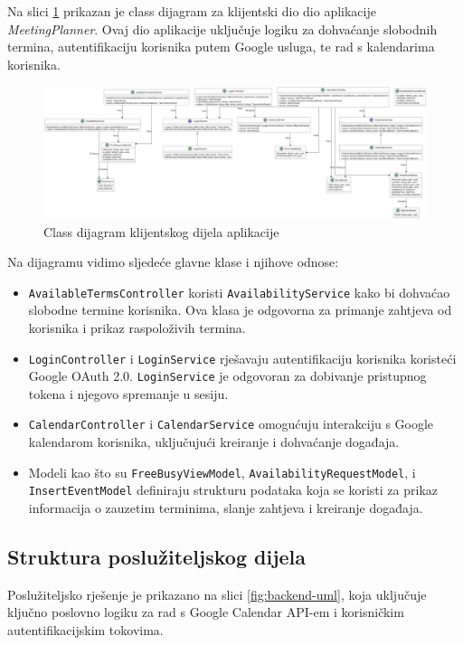 \documentclass{foi}
\begin{document}
Na slici \ref{fig:frontend-uml} prikazan je class dijagram za klijentski dio dio aplikacije \textit{MeetingPlanner}. Ovaj dio aplikacije uključuje logiku za dohvaćanje slobodnih termina, autentifikaciju korisnika putem Google usluga, te rad s kalendarima korisnika.

\begin{figure}[H]
    \centering
    \includegraphics[width=1\textwidth]{slike/MeetingPlannerFrontend_ClassUML.png}
    \caption{Class dijagram klijentskog dijela aplikacije}
    \label{fig:frontend-uml}
\end{figure}

Na dijagramu vidimo sljedeće glavne klase i njihove odnose:
\begin{itemize}
    \item \texttt{AvailableTermsController} koristi \texttt{AvailabilityService} kako bi dohvaćao slobodne termine korisnika. Ova klasa je odgovorna za primanje zahtjeva od korisnika i prikaz raspoloživih termina.
    \item \texttt{LoginController} i \texttt{LoginService} rješavaju autentifikaciju korisnika koristeći Google OAuth 2.0. \texttt{LoginService} je odgovoran za dobivanje pristupnog tokena i njegovo spremanje u sesiju.
    \item \texttt{CalendarController} i \texttt{CalendarService} omogućuju interakciju s Google kalendarom korisnika, uključujući kreiranje i dohvaćanje događaja.
    \item Modeli kao što su \texttt{FreeBusyViewModel}, \texttt{AvailabilityRequestModel}, i \texttt{InsertEventModel} definiraju strukturu podataka koja se koristi za prikaz informacija o zauzetim terminima, slanje zahtjeva i kreiranje događaja.
\end{itemize}

\subsection{Struktura poslužiteljskog dijela}

Poslužiteljsko rješenje je prikazano na slici \ref{fig:backend-uml}, koja uključuje ključno poslovno logiku za rad s Google Calendar API-em i korisničkim autentifikacijskim tokovima.
\end{document}
